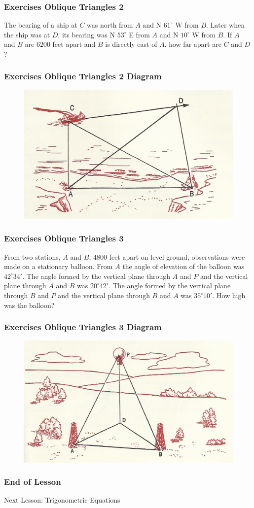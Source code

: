 \documentclass[xcolor=dvipsnames]{beamer}
\begin{document}
\begin{frame}
  \frametitle{Exercises Oblique Triangles 2}
The bearing of a ship at $C$ was north from $A$ and N $61^{\circ}$ W from $B$.
Later when the ship was at $D$, its bearing was N $53^{\circ}$ E from $A$ and
N $10^{\circ}$ W from $B$. If $A$ and $B$ are 6200 feet apart and $B$ is directly
east of $A$, how far apart are $C$ and $D$?
\end{frame}

\begin{frame}
  \frametitle{Exercises Oblique Triangles 2 Diagram}
    \begin{figure}[h]
    \includegraphics[scale=1]{./oblique-02.png}
  \end{figure}
\end{frame}

\begin{frame}
  \frametitle{Exercises Oblique Triangles 3}
  From two stations, $A$ and $B$, 4800 feet apart on level ground,
  observations were made on a stationary balloon. From $A$ the angle
  of elevation of the balloon was $42^{\circ}34'$. The angle formed by
  the vertical plane through $A$ and $P$ and the vertical plane
  through $A$ and $B$ was $20^{\circ}42'$. The angle formed by the
  vertical plane through $B$ and $P$ and the vertical plane through
  $B$ and $A$ was $35^{\circ}10'$. How high was the balloon?
\end{frame}

\begin{frame}
  \frametitle{Exercises Oblique Triangles 3 Diagram}
    \begin{figure}[h]
    \includegraphics[scale=1]{./oblique-03.png}
  \end{figure}
\end{frame}

\begin{frame}
  \frametitle{End of Lesson}
Next Lesson: Trigonometric Equations
\end{frame}
\end{document}
